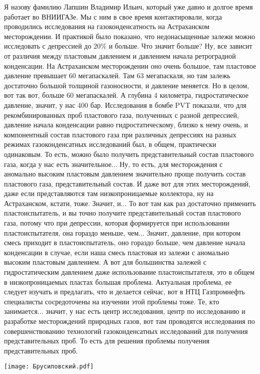 \documentclass[main.tex]{subfiles}
\begin{document}
Я назову фамилию Лапшин Владимир Ильич, который уже давно и долгое время работает во ВНИИГАЗе.
Мы с ним в свое время контактировали, когда проводились исследования на газоконденсатность на Астраханском месторождении.
И практикой было показано, что недонасыщенные залежи можно исследовать с депрессией до 20\% и больше.
Что значит больше?
Ну, все зависит от различия между пластовым давлением и давлением начала ретроградной конденсации.
На Астраханском месторождении оно очень большое, там пластовое давление превышает 60 мегапаскалей.
Там 63 мегапаскаля, но там залежь достаточно большой толщиной газоносности, и давление меняется.
Но в целом, вот так вот, больше 60 мегапаскалей.
А глубина 4 километра, гидростатическое давление, значит, у нас 400 бар.
Исследования в бомбе PVT показали, что для рекомбинированных проб пластового газа, полученных с разной депрессией, давление начала конденсации равно гидростатическому, близко к нему очень, и компонентный состав пластового газа при различных депрессиях на разных режимах газоконденсатных исследований был, в общем, практически одинаковым.
То есть, можно было получить представительный состав пластового газа, когда у нас есть значительное...
Ну, то есть, для месторождения с аномально высоким пластовым давлением значительно проще получить состав пластового газа, представительный состав.
И даже вот для этих месторождений, даже если представляются там низкопроницаемые коллектора, ну на Астраханском, кстати, тоже.
Значит, и...
То вот там как раз достаточно применить пластоиспытатель, и вы точно получите представительный состав пластового газа, потому что при депрессии, которая формируется при использовании пластоиспытателя, она гораздо меньше, чем...
Значит, давление, при котором смесь приходит в пластоиспытатель, оно гораздо больше, чем давление начала конденсации в случае, если наша смесь пластовая из залежи с аномально высоким пластовым давлением.
А вот для большинства залежей с гидростатическим давлением даже использование пластоиспытателя, это в общем в низкопроницаемых пластах большая проблема.
Актуальная проблема, ее следует изучать и предлагать, что и делается сейчас, вот в НТЦ Газпромнефть специалисты сосредоточены на изучении этой проблемы тоже.
Те, кто занимается... значит, у нас есть центр исследования, центр по исследованию и разработке месторождений природных газов, вот там проводятся исследования по совершенствованию технологий газоконденсатных исследований для получения представительных проб.
То есть для решения проблемы получения представительных проб.

\begin{center}
\texttt{[image: Брусиловский.pdf]}
\end{center}
\end{document}
